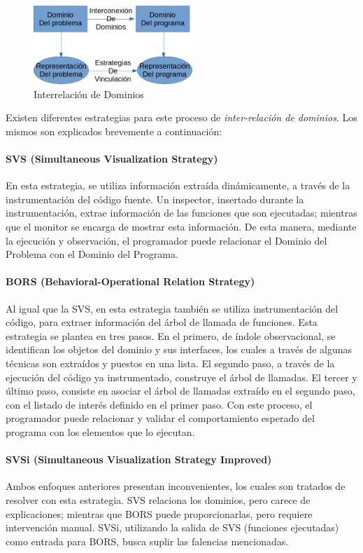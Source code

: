 \begin{figure}[H]
    \includegraphics[width=6cm]{program_comprehension/domains.png}
    \centering
    \caption{Interrelación de Dominios}
\end{figure}

Existen diferentes estrategias\cite{BeronOliveiraCruz10} para este proceso de 
\textit{inter-relación de dominios}.
Los mismos son explicados brevemente a continuación:

\paragraph{SVS (Simultaneous Visualization Strategy)}
En esta estrategia, se utiliza información extraída dinámicamente, a través de
la instrumentación del código fuente.
Un inspector, insertado durante la instrumentación, extrae información de las funciones 
que son ejecutadas; mientras que el monitor se encarga de mostrar esta información.
De esta manera, mediante la ejecución y observación, el programador puede relacionar
el Dominio del Problema con el Dominio del Programa. 

\paragraph{BORS (Behavioral-Operational Relation Strategy)}
Al igual que la SVS, en esta estrategia también se utiliza instrumentación del código,
para extraer información del árbol de llamada de funciones.
Esta estrategia se plantea en tres pasos.
En el primero, de índole observacional, se identifican los objetos del dominio y sus interfaces,
los cuales a través de algunas técnicas son extraídos y puestos en una lista.
El segundo paso, a través de la ejecución del código ya instrumentado, construye el árbol de
llamadas.
El tercer y último paso, consiste en asociar el árbol de llamadas extraído en el segundo paso,
con el listado de interés definido en el primer paso.
Con este proceso, el programador puede relacionar y validar el comportamiento esperado del programa
con los elementos que lo ejecutan\cite{FonsecaCruzHenriquesPereira08}.

\paragraph{SVSi (Simultaneous Visualization Strategy Improved)}
Ambos enfoques anteriores presentan inconvenientes, los cuales son tratados de resolver
con esta estrategia.
SVS relaciona los dominios, pero carece de explicaciones; mientras que BORS puede proporcionarlas,
pero requiere intervención manual.
SVSi, utilizando la salida de SVS (funciones ejecutadas) como entrada para BORS, busca
suplir las falencias mencionadas.
